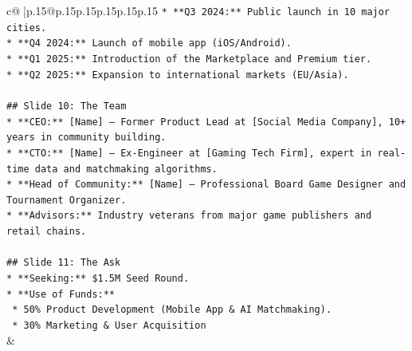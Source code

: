 \documentclass{article}
\begin{document}
{\begin{supertabular}{c@{$\;$}|p{.15\linewidth}@{}p{.15\linewidth}p{.15\linewidth}p{.15\linewidth}p{.15\linewidth}p{.15\linewidth}}
{{{\texttt{*   **Q3 2024:** Public launch in 10 major cities.} \\
\texttt{*   **Q4 2024:** Launch of mobile app (iOS/Android).} \\
\texttt{*   **Q1 2025:** Introduction of the Marketplace and Premium tier.} \\
\texttt{*   **Q2 2025:** Expansion to international markets (EU/Asia).} \\
\\ 
\texttt{\#\# Slide 10: The Team} \\
\texttt{*   **CEO:** {[}Name{]} – Former Product Lead at {[}Social Media Company{]}, 10+ years in community building.} \\
\texttt{*   **CTO:** {[}Name{]} – Ex{-}Engineer at {[}Gaming Tech Firm{]}, expert in real{-}time data and matchmaking algorithms.} \\
\texttt{*   **Head of Community:** {[}Name{]} – Professional Board Game Designer and Tournament Organizer.} \\
\texttt{*   **Advisors:** Industry veterans from major game publishers and retail chains.} \\
\\ 
\texttt{\#\# Slide 11: The Ask} \\
\texttt{*   **Seeking:** \$1.5M Seed Round.} \\
\texttt{*   **Use of Funds:**} \\
\texttt{    *   50\% Product Development (Mobile App \& AI Matchmaking).} \\
\texttt{    *   30\% Marketing \& User Acquisition} \\
            }
        }
    }
    & \\ \\


\end{supertabular}}
\end{document}
